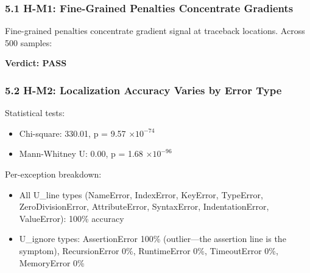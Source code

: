 
\subsubsection{5.1 H-M1: Fine-Grained Penalties Concentrate Gradients}

Fine-grained penalties concentrate gradient signal at traceback locations. Across 500 samples:

\begin{table}[htbp]
\centering
{}
\end{table}

\textbf{Verdict: PASS}

\subsubsection{5.2 H-M2: Localization Accuracy Varies by Error Type}

\begin{table}[htbp]
\centering
{}
\end{table}

Statistical tests:
\begin{itemize}
\item Chi-square: 330.01, p = 9.57 $\times 10^{-74}$
\item Mann-Whitney U: 0.00, p = 1.68 $\times 10^{-96}$
\end{itemize}

Per-exception breakdown:
\begin{itemize}
\item All U\_line types (NameError, IndexError, KeyError, TypeError, ZeroDivisionError, AttributeError, SyntaxError, IndentationError, ValueError): 100\% accuracy
\item U\_ignore types: AssertionError 100\% (outlier---the assertion line is the symptom), RecursionError 0\%, RuntimeError 0\%, TimeoutError 0\%, MemoryError 0\%
\end{itemize}

